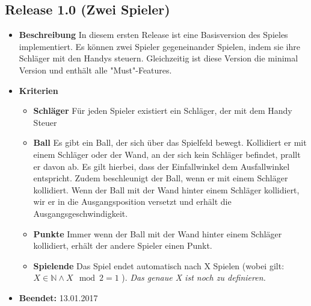 \subsection{Release 1.0 (Zwei Spieler)}
\begin{itemize}
	\item \textbf{Beschreibung}\newline
	In diesem ersten Release ist eine Basisversion des Spieles implementiert. Es können zwei Spieler gegeneinander Spielen, indem sie ihre Schläger mit den Handys steuern. Gleichzeitig ist diese Version die minimal Version und enthält alle "Must"-Features.
	\item \textbf{Kriterien}
	\begin{itemize}
		\item \textbf{Schläger} \newline
		Für jeden Spieler existiert ein Schläger, der mit dem Handy Steuer
		\item \textbf{Ball} \newline
		Es gibt ein Ball, der sich über das Spielfeld bewegt. Kollidiert er mit einem Schläger oder der Wand, an der sich kein Schläger befindet, prallt er davon ab. Es gilt hierbei, dass der Einfallwinkel dem Ausfallwinkel entspricht. Zudem beschleunigt der Ball, wenn er mit einem Schläger kollidiert. Wenn der Ball mit der Wand hinter einem Schläger kollidiert, wir er in die Ausgangsposition versetzt und erhält die Ausgangsgeschwindigkeit.
		\item \textbf{Punkte} \newline
		Immer wenn der Ball mit der Wand hinter einem Schläger kollidiert, erhält der andere Spieler einen Punkt.
		\item \textbf{Spielende} \newline
		Das Spiel endet automatisch nach X Spielen (wobei gilt: $X \in  \mathbb{N} \land X \mod 2 = 1$ ). \textit{Das genaue X ist noch zu definieren.}
	\end{itemize}
	\item \textbf{Beendet:} 13.01.2017
\end{itemize}

